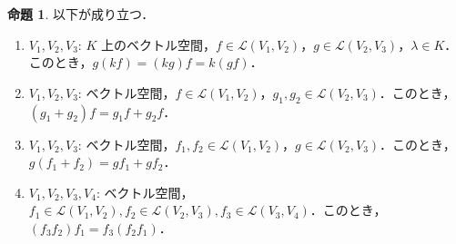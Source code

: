 \documentclass{jlreq}
\theoremstyle{definition}
\newtheorem{prop}[thm]{命題}
\begin{document}
      \begin{prop}
        以下が成り立つ．
        \begin{enumerate}
          \item $V_1,V_2,V_3$: $K$ 上のベクトル空間，$f \in \mathcal{L}(V_1,V_2)$，$g \in \mathcal{L}(V_2,V_3)$，$\lambda \in K$．このとき，$g(kf)=(kg)f=k(gf)$．
          \item $V_1,V_2,V_3$: ベクトル空間，$f \in \mathcal{L}(V_1,V_2)$，$g_1, g_2 \in \mathcal{L}(V_2,V_3)$．このとき，$(g_1+g_2)f=g_1f+g_2f$．
          \item $V_1,V_2,V_3$: ベクトル空間，$f_1,f_2 \in \mathcal{L}(V_1,V_2)$，$g \in \mathcal{L}(V_2,V_3)$．このとき，$g(f_1+f_2)=gf_1+gf_2$．
          \item $V_1,V_2,V_3,V_4$: ベクトル空間，$f_1 \in \mathcal{L}(V_1,V_2), f_2 \in \mathcal{L}(V_2,V_3), f_3 \in \mathcal{L}(V_3,V_4)$．このとき，$(f_3f_2)f_1=f_3(f_2f_1)$．
        \end{enumerate}
      \end{prop}
\end{document}

